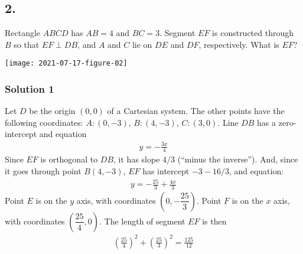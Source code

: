 \documentclass[12pt]{article}
\begin{document}
\subsection*{2.}

\nopagebreak

Rectangle $ABCD$ has $AB = 4$ and $BC = 3$. Segment $EF$ is constructed through $B$ so that $EF \perp DB$, and $A$ and $C$ lie on $DE$ and $DF$, respectively. What is $EF$?

\nopagebreak


\begin{answer}
\begin{center}
  \texttt{[image: 2021-07-17-figure-02]}
\end{center}
\subsubsection*{Solution 1}
Let $D$ be the origin $(0,0)$ of a Cartesian system. The other points have the following coordinates: $A:(0,-3)$, $B:(4,-3)$, $C:(3,0)$. Line $DB$ has a zero-intercept and equation
\begin{align*}
y = -\frac{3x}{4}
\end{align*}
Since $EF$ is orthogonal to $DB$, it has slope $4/3$ (``minus the inverse''). And, since it goes through point $B(4,-3)$, $EF$ has intercept $-3-16/3$, and equation:
\begin{align*}
y = -\frac{25}{3} + \frac{4x}{3}
\end{align*}
Point $E$ is on the $y$ axis, with coordinates $\left(0,-\dfrac{25}{3}\right)$. 
Point $F$ is on the $x$ axis, with coordinates $\left(\dfrac{25}{4},0\right)$. 
The length of segment $EF$ is then
\begin{align*}
\left(\frac{25}{4}\right)^2 + \left(\frac{25}{3}\right)^2
  = \frac{125}{12}
\end{align*}
\end{answer}
\end{document}
